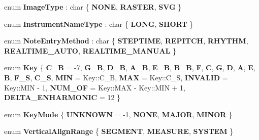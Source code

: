 \begin{DoxyCompactItemize}
enum {\bfseries Image\+Type} \+: char \{ {\bfseries N\+O\+NE}, 
{\bfseries R\+A\+S\+T\+ER}, 
{\bfseries S\+VG}
 \}
\item 
\mbox{\label{namespace_ms_ab54b64cb63c82e526409c8c43e1d4aee}} 
enum {\bfseries Instrument\+Name\+Type} \+: char \{ {\bfseries L\+O\+NG}, 
{\bfseries S\+H\+O\+RT}
 \}
\item 
\mbox{\label{namespace_ms_a33bc7982f565376d042918ae3c91d3d6}} 
enum {\bfseries Note\+Entry\+Method} \+: char \{ \newline
{\bfseries S\+T\+E\+P\+T\+I\+ME}, 
{\bfseries R\+E\+P\+I\+T\+CH}, 
{\bfseries R\+H\+Y\+T\+HM}, 
{\bfseries R\+E\+A\+L\+T\+I\+M\+E\+\_\+\+A\+U\+TO}, 
\newline
{\bfseries R\+E\+A\+L\+T\+I\+M\+E\+\_\+\+M\+A\+N\+U\+AL}
 \}
\item 
\mbox{\label{namespace_ms_a179a9005112d5cdef0f8a79327c752e6}} 
enum {\bfseries Key} \{ \newline
{\bfseries C\+\_\+B} = -\/7, 
{\bfseries G\+\_\+B}, 
{\bfseries D\+\_\+B}, 
{\bfseries A\+\_\+B}, 
\newline
{\bfseries E\+\_\+B}, 
{\bfseries B\+\_\+B}, 
{\bfseries F}, 
{\bfseries C}, 
\newline
{\bfseries G}, 
{\bfseries D}, 
{\bfseries A}, 
{\bfseries E}, 
\newline
{\bfseries B}, 
{\bfseries F\+\_\+S}, 
{\bfseries C\+\_\+S}, 
{\bfseries M\+IN} = Key\+:\+:C\+\_\+B, 
\newline
{\bfseries M\+AX} = Key\+:\+:C\+\_\+S, 
{\bfseries I\+N\+V\+A\+L\+ID} = Key\+:\+:M\+IN -\/ 1, 
{\bfseries N\+U\+M\+\_\+\+OF} = Key\+:\+:M\+AX -\/ Key\+:\+:M\+IN + 1, 
{\bfseries D\+E\+L\+T\+A\+\_\+\+E\+N\+H\+A\+R\+M\+O\+N\+IC} = 12
 \}
\item 
\mbox{\label{namespace_ms_a2eb1b28e95da78e69feaf07326b62318}} 
enum {\bfseries Key\+Mode} \{ {\bfseries U\+N\+K\+N\+O\+WN} = -\/1, 
{\bfseries N\+O\+NE}, 
{\bfseries M\+A\+J\+OR}, 
{\bfseries M\+I\+N\+OR}
 \}
\item 
\mbox{\label{namespace_ms_a72e619a51799cbb2ec85aa0a07e8fd18}} 
enum {\bfseries Vertical\+Align\+Range} \{ {\bfseries S\+E\+G\+M\+E\+NT}, 
{\bfseries M\+E\+A\+S\+U\+RE}, 
{\bfseries S\+Y\+S\+T\+EM}
 \}
\item 

\end{DoxyCompactItemize}
